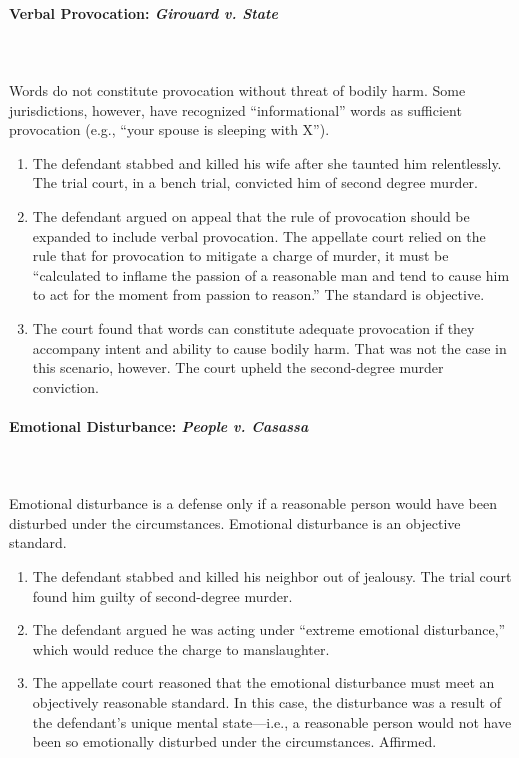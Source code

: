 \paragraph{Verbal Provocation: \emph{Girouard v. State}}
~\\\\
Words do not constitute provocation without threat of bodily harm. Some 
jurisdictions, however, have recognized ``informational'' words as sufficient 
provocation (e.g., ``your spouse is sleeping with X'').

\begin{enumerate}
    \item The defendant stabbed and killed his wife after she taunted him 
    relentlessly. The trial court, in a bench trial, convicted him of second 
    degree murder.
    \item The defendant argued on appeal that the rule of provocation should 
    be expanded to include verbal provocation. The appellate court relied on 
    the rule that for provocation to mitigate a charge of murder, it must be 
    ``calculated to inflame the passion of a reasonable man and tend to cause 
    him to act for the moment from passion to reason.'' The standard is 
    objective.
    \item The court found that words can constitute adequate provocation if 
    they accompany intent and ability to cause bodily harm. That was not the 
    case in this scenario, however. The court upheld the second-degree murder 
    conviction.
\end{enumerate}

\paragraph{Emotional Disturbance: \emph{People v. Casassa}}
~\\\\
Emotional disturbance is a defense only if a reasonable person would have been 
disturbed under the circumstances. Emotional disturbance is an objective 
standard.

\begin{enumerate}
    \item The defendant stabbed and killed his neighbor out of jealousy. The 
    trial court found him guilty of second-degree murder.
    \item The defendant argued he was acting under ``extreme emotional 
    disturbance,'' which would reduce the charge to manslaughter.
    \item The appellate court reasoned that the emotional disturbance must 
    meet an objectively reasonable standard. In this case, the disturbance was 
    a result of the defendant's unique mental state---i.e., a reasonable 
    person would not have been so emotionally disturbed under the 
    circumstances. Affirmed.
\end{enumerate}


